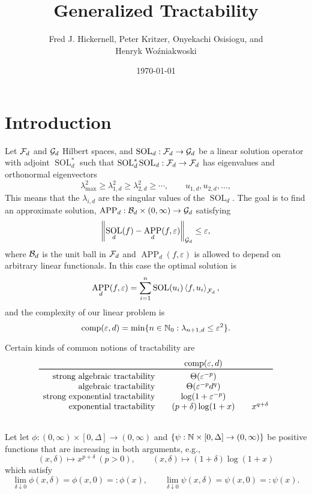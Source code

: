 \documentclass{article}
\title{Generalized Tractability}
\author{Fred J. Hickernell, Peter Kritzer, Onyekachi Osisiogu, and \\ Henryk Wo\'zniakwoski}
\date{\today}
\DeclareMathOperator{\SOL}{SOL}
\DeclareMathOperator{\APP}{APP}
\theoremstyle{definition}
\begin{document}
\maketitle

\section{Introduction}

Let $\mathcal{F}_d$ and $\mathcal{G}_d$ Hilbert spaces, and $\SOL_d : \cf_d \to \cg_d$ be a linear solution operator with adjoint $\SOL_d^*$ such that $\SOL_d^*\SOL_d : \cf_d \to \cf_d$ has eigenvalues and orthonormal eigenvectors  
\[
\lambda_{\max}^2 \ge \lambda_{1,d}^2 \ge \lambda_{2,d}^2 \ge \cdots, \qquad u_{1,d}, u_{2,d}, \ldots, 
\]
This means that the $\lambda_{i,d}$ are the singular values of the $\SOL_d$. The goal is to find an approximate solution, $\APP_d:\cb_d \times (0,\infty) \to \cg_d$ satisfying 
\[
\norm[\cg_d]{\SOL_d(f) - \APP_d(f,\varepsilon)} \le \varepsilon,
\]
where $\mathcal{B}_d$ is the unit ball in $\mathcal{F}_d$ and $\APP_d(f,\varepsilon)$ is allowed to depend on arbitrary linear functionals.  In this case the optimal solution is 
\[
\APP_d(f,\varepsilon) = \sum_{i=1}^n \SOL(u_i) \ip[\cf_d]{f}{u_i},
\]
and the complexity of our linear problem is
\[
\operatorname{comp}(\varepsilon, d) = \min \{n \in \mathbb{N}_{0} : \lambda_{n+1, d} \le \varepsilon^2\}.
\]

Certain kinds of common notions of tractability are 
\begin{equation*}
    \begin{array}{r@{\qquad}c@{\qquad}c}
    & \comp(\varepsilon, d)\\
    \toprule
    \text{strong algebraic tractability} & \Theta(\varepsilon^{-p})\\
    \text{ algebraic tractability} & \Theta(\varepsilon^{-p}d^{q})\\
    \text{strong exponential tractability} & \log(1 + \varepsilon^{-p})\\
    \text{ exponential tractability} &(p+\delta) \log(1 + x) &  x^{q+\delta} \\
    & 
    \end{array}
\end{equation*}

Let let $\phi : (0,\infty) \times [0,\Delta] \to (0,\infty)$ and $\{\psi : \mathbb{N}  \times [0,\Delta] \to (0,\infty)\}$ be positive functions that are increasing in both arguments, e.g., 
\[
(x,\delta) \mapsto x^{p + \delta} \ (p >0), \qquad (x,\delta) \mapsto (1 + \delta) \log(1+x)
\]
which satisfy
\begin{equation*}
    \lim_{\delta \downarrow 0} \phi(x,\delta) = \phi(x,0) =: \phi(x), \qquad 
    \lim_{\delta \downarrow 0} \psi(x,\delta) = \psi(x,0) =: \psi(x).
\end{equation*}
\end{document}
